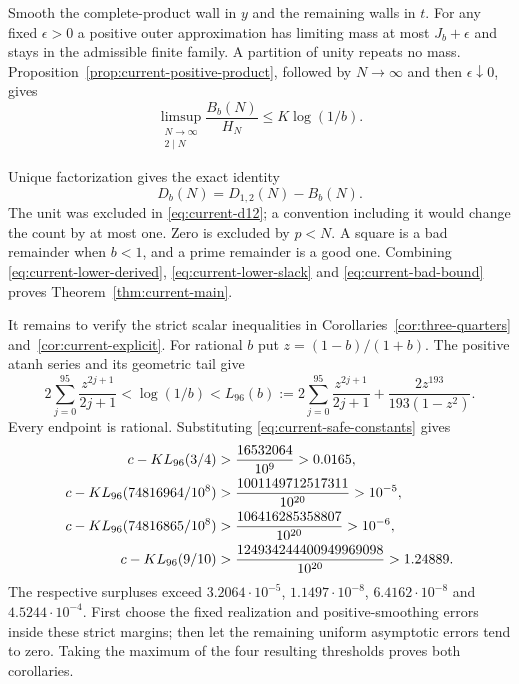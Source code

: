 Smooth the complete-product wall in $y$ and the remaining walls
in $t$.  For any fixed $\epsilon>0$ a positive outer approximation
has limiting mass at most $J_b+\epsilon$ and stays in the admissible
finite family.  A partition of unity repeats no mass.
Proposition~\ref{prop:current-positive-product}, followed by
$N\to\infty$ and then $\epsilon\downarrow0$, gives
\begin{equation}
 \limsup_{\substack{N\to\infty\\2\mid N}}
             \frac{B_b(N)}{H_N}\le K\log(1/b).
 \label{eq:current-bad-bound}
\end{equation}

Unique factorization gives the exact identity
\begin{equation}
                         D_b(N)=D_{1,2}(N)-B_b(N).
 \label{eq:current-exact-subtraction}
\end{equation}
The unit was excluded in \eqref{eq:current-d12}; a convention
including it would change the count by at most one.  Zero is
excluded by $p<N$.  A square is a bad remainder when $b<1$, and
a prime remainder is a good one.  Combining
\eqref{eq:current-lower-derived}, \eqref{eq:current-lower-slack}
and \eqref{eq:current-bad-bound} proves
Theorem~\ref{thm:current-main}.

It remains to verify the strict scalar inequalities in
Corollaries~\ref{cor:three-quarters} and~\ref{cor:current-explicit}. For rational $b$ put $z=(1-b)/(1+b)$.
The positive atanh series and its geometric tail give
\begin{equation}
 2\sum_{j=0}^{95}\frac{z^{2j+1}}{2j+1}
 <\log(1/b)
 <L_{96}(b):=
 2\sum_{j=0}^{95}\frac{z^{2j+1}}{2j+1}
       +\frac{2z^{193}}{193(1-z^2)}.
 \label{eq:current-log-certificate}
\end{equation}
Every endpoint is rational.  Substituting
\eqref{eq:current-safe-constants} gives
\begin{align}
 c-KL_{96}(3/4)&>\frac{16532064}{10^9}>0.0165,\notag\\
 c-KL_{96}(74816964/10^8)
     &>\frac{1001149712517311}{10^{20}}>10^{-5},\notag\\
 c-KL_{96}(74816865/10^8)
     &>\frac{106416285358807}{10^{20}}>10^{-6},
                 \label{eq:current-rational-margins}\\
 c-KL_{96}(9/10)
     &>\frac{124934244400949969098}{10^{20}}>1.24889.\notag
\end{align}
The respective surpluses exceed $3.2064\cdot10^{-5}$,
$1.1497\cdot10^{-8}$, $6.4162\cdot10^{-8}$ and
$4.5244\cdot10^{-4}$.  First choose the fixed realization and
positive-smoothing errors inside these strict margins; then let
the remaining uniform asymptotic errors tend to zero.  Taking the
maximum of the four resulting thresholds proves both corollaries.

